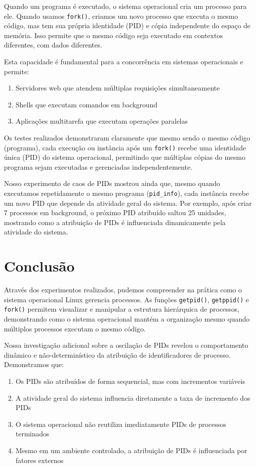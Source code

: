 \documentclass[a4paper,11pt]{article}
\begin{document}
Quando um programa é executado, o sistema operacional cria um processo para ele. Quando usamos \texttt{fork()}, criamos um novo processo que executa o mesmo código, mas tem sua própria identidade (PID) e cópia independente do espaço de memória. Isso permite que o mesmo código seja executado em contextos diferentes, com dados diferentes.

Esta capacidade é fundamental para a concorrência em sistemas operacionais e permite:
\begin{enumerate}
    \item Servidores web que atendem múltiplas requisições simultaneamente
    \item Shells que executam comandos em background
    \item Aplicações multitarefa que executam operações paralelas
\end{enumerate}

Os testes realizados demonstraram claramente que mesmo sendo o mesmo código (programa), cada execução ou instância após um \texttt{fork()} recebe uma identidade única (PID) do sistema operacional, permitindo que múltiplas cópias do mesmo programa sejam executadas e gerenciadas independentemente.

Nosso experimento de caos de PIDs mostrou ainda que, mesmo quando executamos repetidamente o mesmo programa (\texttt{pid\_info}), cada instância recebe um novo PID que depende da atividade geral do sistema. Por exemplo, após criar 7 processos em background, o próximo PID atribuído saltou 25 unidades, mostrando como a atribuição de PIDs é influenciada dinamicamente pela atividade do sistema.

\section{Conclusão}

Através dos experimentos realizados, pudemos compreender na prática como o sistema operacional Linux gerencia processos. As funções \texttt{getpid()}, \texttt{getppid()} e \texttt{fork()} permitem visualizar e manipular a estrutura hierárquica de processos, demonstrando como o sistema operacional mantém a organização mesmo quando múltiplos processos executam o mesmo código.

Nossa investigação adicional sobre a oscilação de PIDs revelou o comportamento dinâmico e não-determinístico da atribuição de identificadores de processo. Demonstramos que:

\begin{enumerate}
    \item Os PIDs são atribuídos de forma sequencial, mas com incrementos variáveis
    \item A atividade geral do sistema influencia diretamente a taxa de incremento dos PIDs
    \item O sistema operacional não reutiliza imediatamente PIDs de processos terminados
    \item Mesmo em um ambiente controlado, a atribuição de PIDs é influenciada por fatores externos
\end{enumerate}
\end{document}
